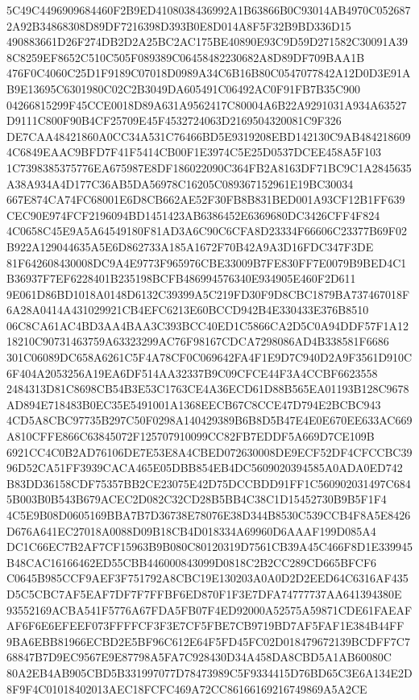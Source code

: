 \documentclass[UTF8,fontset=fandol,zihao=-4,a4paper]{ctexart}
\begin{document}
{{5C49C4496909684460F2B9ED4108038436992A1B63866B0C93014AB4970C0526872A92B34868308D89DF7216398D393B0E8D014A8F5F32B9BD336D15
490883661D26F274DB2D2A25BC2AC175BE40890E93C9D59D271582C30091A398C8259EF8652C510C505F089389C06458482230682A8D89DF709BAA1B
476F0C4060C25D1F9189C07018D0989A34C6B16B80C0547077842A12D0D3E91AB9E13695C6301980C02C2B3049DA605491C06492AC0F91FB7B35C900
04266815299F45CCE0018D89A631A9562417C80004A6B22A9291031A934A63527D9111C800F90B4CF25709E45F4532724063D2169504320081C9F326
DE7CAA48421860A0CC34A531C76466BD5E9319208EBD142130C9AB4842186094C6849EAAC9BFD7F41F5414CB00F1E3974C5E25D0537DCEE458A5F103
1C7398385375776EA675987E8DF186022090C364FB2A8163DF71BC9C1A2845635A38A934A4D177C36AB5DA56978C16205C089367152961E19BC30034
667E874CA74FC68001E6D8CB662AE52F30FB8B831BED001A93CF12B1FF639CEC90E974FCF2196094BD1451423AB6386452E6369680DC3426CFF4F824
4C0658C45E9A5A64549180F81AD3A6C90C6CFA8D23334F66606C23377B69F02B922A129044635A5E6D862733A185A1672F70B42A9A3D16FDC347F3DE
81F642608430008DC9A4E9773F965976CBE33009B7FE830FF7E0079B9BED4C1B36937F7EF6228401B235198BCFB486994576340E934905E460F2D611
9E061D86BD1018A0148D6132C39399A5C219FD30F9D8CBC1879BA737467018F6A28A0414A431029921CB4EFC6213E60BCCD942B4E330433E376B8510
06C8CA61AC4BD3AA4BAA3C393BCC40ED1C5866CA2D5C0A94DDF57F1A1218210C90731463759A63323299AC76F98167CDCA7298086AD4B338581F6686
301C06089DC658A6261C5F4A78CF0C069642FA4F1E9D7C940D2A9F3561D910C6F404A2053256A19EA6DF514AA32337B9C09CFCE44F3A4CCBF6623558
2484313D81C8698CB54B3E53C1763CE4A36ECD61D88B565EA01193B128C9678AD894E718483B0EC35E5491001A1368EECB67C8CCE47D794E2BCBC943
4CD5A8CBC97735B297C50F0298A140429389B6B8D5B47E4E0E670EE633AC669A810CFFE866C63845072F125707910099CC82FB7EDDF5A669D7CE109B
6921CC4C0B2AD76106DE7E53E8A4CBED072630008DE9ECF52DF4CFCCBC3996D52CA51FF3939CACA465E05DBB854EB4DC5609020394585A0ADA0ED742
B83DD36158CDF75357BB2CE23075E42D75DCCBDD91FF1C560902031497C6845B003B0B543B679ACEC2D082C32CD28B5BB4C38C1D15452730B9B5F1F4
4C5E9B08D0605169BBA7B7D36738E78076E38D344B8530C539CCB4F8A5E8426D676A641EC27018A0088D09B18CB4D018334A69960D6AAAF199D085A4
DC1C66EC7B2AF7CF15963B9B080C80120319D7561CB39A45C466F8D1E339945B48CAC16166462ED55CBB446000843099D0818C2B2CC289CD665BFCF6
C0645B985CCF9AEF3F751792A8CBC19E130203A0A0D2D2EED64C6316AF435D5C5CBC7AF5EAF7DF7F7FFBF6ED870F1F3E7DFA74777737AA641394380E
93552169ACBA541F5776A67FDA5FB07F4ED92000A52575A59871CDE61FAEAFAF6F6E6EFEEF073FFFFCF3F3E7CF5FBE7CB9719BD7AF5FAF1E384B44FF
9BA6EBB81966ECBD2E5BF96C612E64F5FD45FC02D018479672139BCDFF7C768847B7D9EC9567E9E87798A5FA7C928430D34A458DA8CBD5A1AB60080C
80A2EB4AB905CBD5B331997077D78473989C5F9334415D76BD65C3E6A134E2D8F9F4C01018402013AEC18FCFC469A72CC86166169216749869A5A2CE
}}
\end{document}
